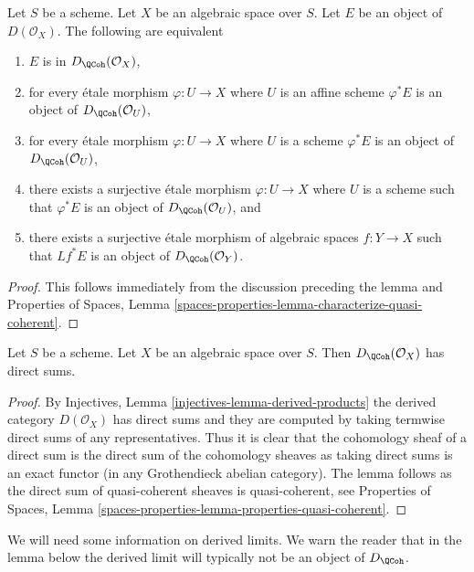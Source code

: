 \begin{lemma}
\label{lemma-check-quasi-coherence-on-covering}
Let $S$ be a scheme. Let $X$ be an algebraic space over $S$.
Let $E$ be an object of $D(\mathcal{O}_X)$. The following are equivalent
\begin{enumerate}
\item $E$ is in $D_\QCoh(\mathcal{O}_X)$,
\item for every \'etale morphism $\varphi : U \to X$ where $U$ is an
affine scheme $\varphi^*E$ is an object of
$D_\QCoh(\mathcal{O}_U)$,
\item for every \'etale morphism $\varphi : U \to X$ where $U$ is a scheme
$\varphi^*E$ is an object of
$D_\QCoh(\mathcal{O}_U)$,
\item there exists a surjective \'etale morphism $\varphi : U \to X$
where $U$ is a scheme such that $\varphi^*E$ is an object of
$D_\QCoh(\mathcal{O}_U)$, and
\item there exists a surjective \'etale morphism of algebraic spaces
$f : Y \to X$ such that $Lf^*E$ is an object of
$D_\QCoh(\mathcal{O}_Y)$.
\end{enumerate}
\end{lemma}

\begin{proof}
This follows immediately from the discussion preceding the lemma and
Properties of Spaces, Lemma
\ref{spaces-properties-lemma-characterize-quasi-coherent}.
\end{proof}

\begin{lemma}
\label{lemma-quasi-coherence-direct-sums}
Let $S$ be a scheme. Let $X$ be an algebraic space over $S$.
Then $D_\QCoh(\mathcal{O}_X)$ has direct sums.
\end{lemma}

\begin{proof}
By Injectives, Lemma \ref{injectives-lemma-derived-products}
the derived category $D(\mathcal{O}_X)$ has direct sums and
they are computed by taking termwise direct sums of any representatives.
Thus it is clear that the cohomology sheaf of a direct sum is the
direct sum of the cohomology sheaves as taking direct sums is
an exact functor (in any Grothendieck abelian category). The lemma
follows as the direct sum of quasi-coherent sheaves is quasi-coherent, see
Properties of Spaces, Lemma
\ref{spaces-properties-lemma-properties-quasi-coherent}.
\end{proof}

\noindent
We will need some information on derived limits. We warn the reader
that in the lemma below the derived limit will typically not be
an object of $D_\QCoh$.

